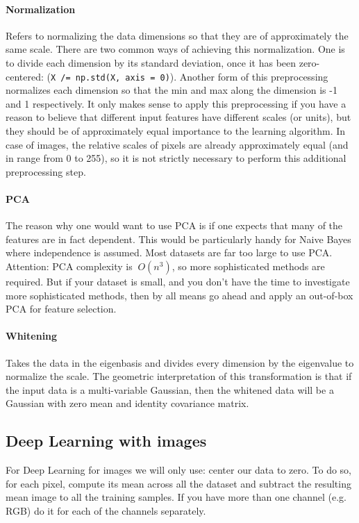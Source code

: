 \paragraph*{Normalization} Refers to normalizing the data dimensions so that they are of approximately the same scale. There are two common ways of achieving this normalization. One is to divide each dimension by its standard deviation, once it has been zero-centered: (\texttt{X /= np.std(X, axis = 0)}). Another form of this preprocessing normalizes each dimension so that the min and max along the dimension is -1 and 1 respectively. It only makes sense to apply this preprocessing if you have a reason to believe that different input features have different scales (or units), but they should be of approximately equal importance to the learning algorithm. In case of images, the relative scales of pixels are already approximately equal (and in range from 0 to 255), so it is not strictly necessary to perform this additional preprocessing step.

\paragraph*{PCA} The reason why one would want to use PCA is if one expects that many of the features are in fact dependent. This would be particularly handy for Naive Bayes where independence is assumed. Most datasets are far too large to use PCA. Attention: PCA complexity is $~O(n^3)$, so more sophisticated methods are required. But if your dataset is small, and you don't have the time to investigate more sophisticated methods, then by all means go ahead and apply an out-of-box PCA for feature selection.

\paragraph*{Whitening} Takes the data in the eigenbasis and divides every dimension by the eigenvalue to normalize the scale. The geometric interpretation of this transformation is that if the input data is a multi-variable Gaussian, then the whitened data will be a Gaussian with zero mean and identity covariance matrix.

\subsection*{Deep Learning with images}
For Deep Learning for images we will only use: center our data to zero. To do so, for each pixel, compute its mean across all the dataset and subtract the resulting mean image to all the training samples. If you have more than one channel (e.g. RGB) do it for each of the channels separately.
